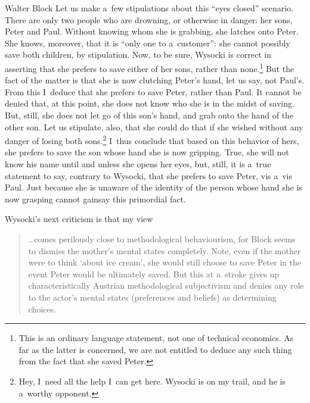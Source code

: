 \begin{artengenv}{Walter Block}
Let us make a~few stipulations about this ``eyes closed'' scenario. There are only two people who are drowning, or otherwise in danger: her sons, Peter and Paul. Without knowing whom she is grabbing, she latches onto Peter. She knows, moreover, that it is ``only one to a~customer'': she cannot possibly save both children, by stipulation. Now, to be sure, Wysocki is correct in asserting that she prefers to save either of her sons, rather than none.\footnote{This is an ordinary language statement, not one of technical economics. As far as the latter is concerned, we are not entitled to deduce any such thing from the fact that she saved Peter.} But the fact of the matter is that she is now clutching Peter's hand, let us say, not Paul's. From this I~deduce that she prefers to save Peter, rather than Paul. It cannot be denied that, at this point, she does not know who she is in the midst of saving. But, still, she does not let go of this son's hand, and grab onto the hand of the other son. Let us stipulate, also, that she could do that if she wished without any danger of losing both sons.\footnote{Hey, I~need all the help I~can get here. Wysocki is on my trail, and he is a~worthy opponent.} I~thus conclude that based on this behavior of hers, she prefers to save the son whose hand she is now gripping. True, she will not know his name until and unless she opens her eyes, but, still, it is a~true statement to say, contrary to Wysocki, that she prefers to save Peter, vis a~vis Paul. Just because she is unaware of the identity of the person whose hand she is now grasping cannot gainsay this primordial fact.



Wysocki's next criticism is that my view



\begin{quote}
…comes perilously close to methodological behaviourism, for Block seems to dismiss the mother's mental states completely. Note, even if the mother were to think ‘about ice cream', she would still choose to save Peter in the event Peter would be ultimately saved. But this at a~stroke gives up characteristically Austrian methodological subjectivism and denies any role to the actor's mental states (preferences and beliefs) as determining choices.
\end{quote}




\end{artengenv}
